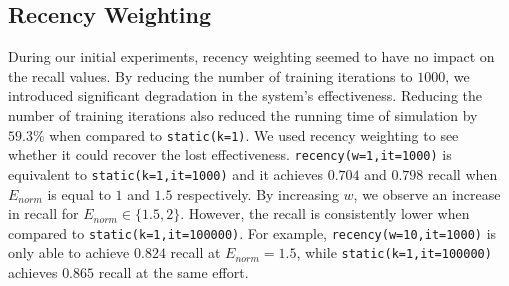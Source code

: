 \subsection*{Recency Weighting}

During our initial experiments, recency weighting seemed to have no
impact on the recall values. By reducing the number of training iterations
to $1000$, we introduced significant degradation in the system's effectiveness.
Reducing the number of training iterations also
reduced the running time of simulation by $59.3\%$ when compared to
\texttt{static(k=1)}. We used recency weighting to see whether it could recover
the lost effectiveness.  \texttt{recency(w=1,it=1000)} is equivalent to
\texttt{static(k=1,it=1000)} and it achieves $0.704$ and $0.798$
recall when $E_{norm}$ is equal to $1$ and $1.5$ respectively. By increasing
$w$, we observe an increase in recall for $E_{norm} \in \{1.5, 2\}$. However,
the recall is consistently lower when compared to
\texttt{static(k=1,it=100000)}. For example, \texttt{recency(w=10,it=1000)} is
only able to achieve $0.824$ recall at $E_{norm}=1.5$, while
\texttt{static(k=1,it=100000)} achieves $0.865$ recall at the same effort.


\begin{table}[]
\centering
\caption{Summary of results for recency weighting}
\label{table.recency}
\end{table}

